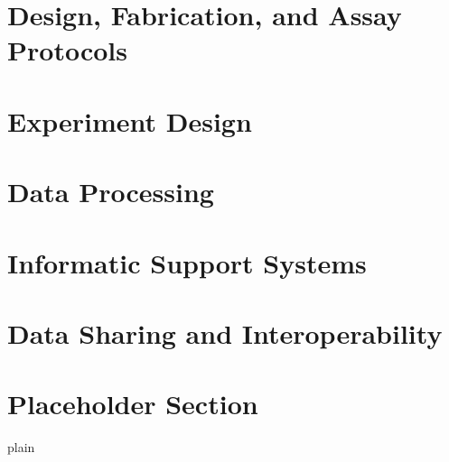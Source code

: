 \section{Design, Fabrication, and Assay Protocols}
\label{Assay}


\section{Experiment Design}
\label{Experiment Design}


\section{Data Processing}
\label{Data Processing}


\section{Informatic Support Systems}
\label{Informatics}


\section{Data Sharing and Interoperability}
\label{Sharing}


\section{Placeholder Section}
\label{XXX}


 {plain}

